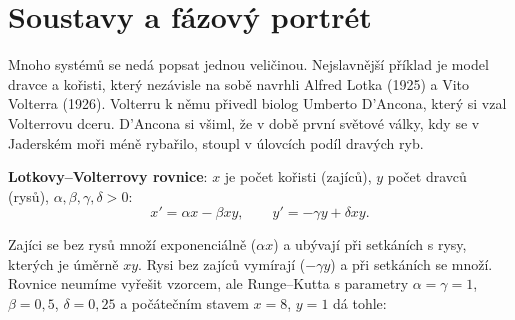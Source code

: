 \section{Soustavy a fázový portrét}

Mnoho systémů se nedá popsat jednou veličinou. Nejslavnější příklad je model dravce a kořisti, který nezávisle na sobě navrhli Alfred Lotka (1925) a Vito Volterra (1926). Volterru k němu přivedl biolog Umberto D'Ancona, který si vzal Volterrovu dceru. D'Ancona si všiml, že v době první světové války, kdy se v Jaderském moři méně rybařilo, stoupl v úlovcích podíl dravých ryb.

\begin{definitionbox}
  \textbf{Lotkovy--Volterrovy rovnice}: $x$ je počet kořisti (zajíců), $y$ počet dravců (rysů), $\alpha, \beta, \gamma, \delta > 0$:
  \begin{equation*}
    x' = \alpha x - \beta xy,\qquad y' = -\gamma y + \delta xy.
  \end{equation*}
\end{definitionbox}

Zajíci se bez rysů množí exponenciálně ($\alpha x$) a ubývají při setkáních s rysy, kterých je úměrně $xy$. Rysi bez zajíců vymírají ($-\gamma y$) a při setkáních se množí. Rovnice neumíme vyřešit vzorcem, ale Runge--Kutta s parametry $\alpha = \gamma = 1$, $\beta = 0{,}5$, $\delta = 0{,}25$ a počátečním stavem $x = 8$, $y = 1$ dá tohle:

